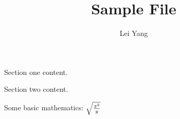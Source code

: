 \documentclass[11pt, oneside]{article}   	%
\title{Sample File}
\author{Lei Yang}
\begin{document}
\maketitle
Section one content.

Section two content.

Some basic mathematics: $\sqrt{ {x ^ 2 \over y} }$
\end{document}
